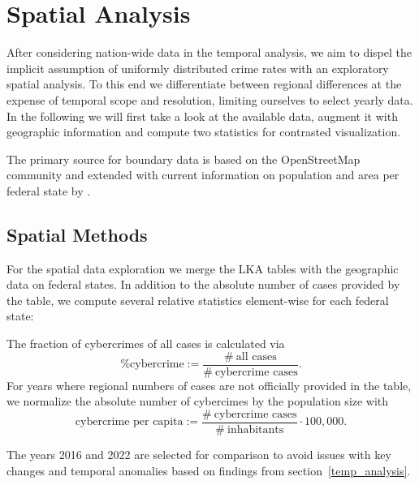 \documentclass{article}
\theoremstyle{plain}
\theoremstyle{definition}
\theoremstyle{remark}
\begin{document}
\section{Spatial Analysis}
\label{spatial_analysis}
After considering nation-wide data in the temporal analysis, we aim to dispel the implicit assumption of uniformly distributed crime rates with an exploratory spatial analysis. To this end we differentiate between regional differences at the expense of temporal scope and resolution, limiting ourselves to select yearly data. In the following we will first take a look at the available data, augment it with geographic information and compute two statistics for contrasted visualization.

The primary source for boundary data is based on the OpenStreetMap community \citep{geodata} and extended with current information on population and area per federal state by \citet{populationdata}.

\subsection{Spatial Methods}
\label{spatial_methods}

For the spatial data exploration we merge the LKA tables with the geographic data on federal states. In addition to the absolute number of cases provided by the table, we compute several relative statistics element-wise for each federal state:

The fraction of cybercrimes of all cases is calculated via
$$\text{\% cybercrime}:=\frac{\#\ \text{all cases}}{\#\ \text{cybercrime cases}} .$$
For years where regional numbers of cases are not officially provided in the table, we normalize the absolute number of cybercimes by the population size with
$$\text{cybercrime per capita}:=\frac{\#\ \text{cybercrime cases}}{\#\ \text{inhabitants}}\cdot100,000 .$$

The years 2016 and 2022 are selected for comparison to avoid issues with key changes and temporal anomalies based on findings from section~\ref{temp_analysis}.
\end{document}
